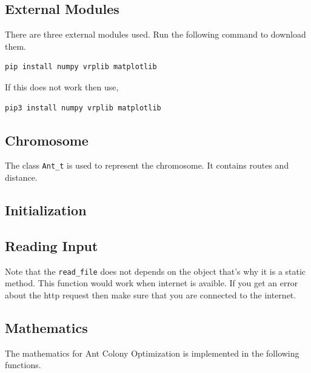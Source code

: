 \documentclass[12pt]{report}
\begin{document}
\subsection{External Modules}
There are three external modules used. Run the following command to download them.
\begin{lstlisting}[language=bash]
pip install numpy vrplib matplotlib
\end{lstlisting}

If this does not work then use,
\begin{lstlisting}[language=bash]
pip3 install numpy vrplib matplotlib
\end{lstlisting}



\subsection{Chromosome}
The class {\tt Ant\_t} is used to represent the chromosome. It contains routes and distance.


\newpage

\subsection{Initialization}


\newpage

\subsection{Reading Input}
Note that the {\tt read\_file} does not depends on the object that's why it is a static method. This function would work when internet is avaible. If you get an error about the http request then make sure that you are connected to the internet.


\subsection{Mathematics}
The mathematics for Ant Colony Optimization is implemented in the following functions.

\end{document}
